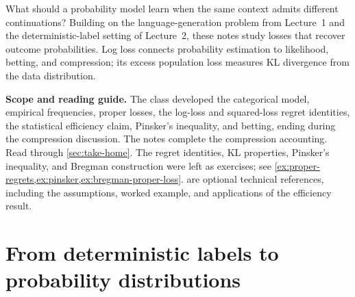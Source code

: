 \documentclass[11pt,twoside]{article}
\theoremstyle{definition}
\theoremstyle{remark}
\begin{document}
\begin{center}
\end{center}

What should a probability model learn when the same context admits different
continuations? Building on the language-generation problem from Lecture~1
and the deterministic-label setting of Lecture~2, these notes study losses
that recover outcome probabilities. Log loss connects probability estimation
to likelihood, betting, and compression; its excess population loss measures
KL divergence from the data distribution.

\noindent\textbf{Scope and reading guide.}
The class developed the categorical model, empirical frequencies, proper
losses, the log-loss and squared-loss regret identities, the statistical
efficiency claim, Pinsker's inequality, and betting, ending during the
compression discussion. The notes complete the compression accounting.
Read through \cref{sec:take-home}. The regret identities, KL properties,
Pinsker's inequality, and Bregman construction were left as exercises; see
\cref{ex:proper-regrets,ex:pinsker,ex:bregman-proper-loss}.
 are optional technical references, including
the assumptions, worked example, and applications of the efficiency result.

\section{From deterministic labels to probability distributions}
\label{sec:from-labels}
\end{document}
